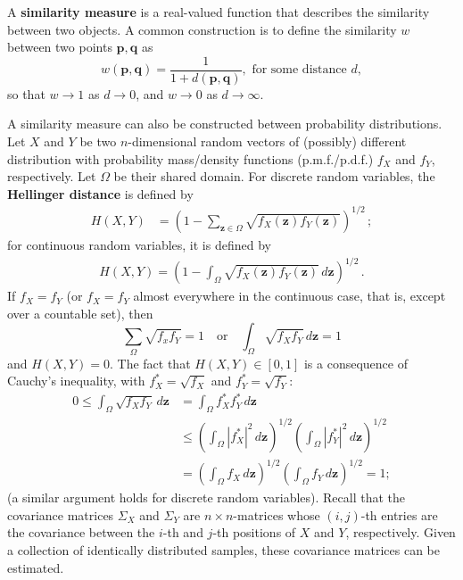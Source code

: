 A \textbf{similarity measure} is a real-valued function that describes the similarity between two objects.
A common construction is to define the similarity $w$ between two points $\mathbf{p},\mathbf{q}$ as $$w(\mathbf{p},\mathbf{q})=\frac{1}{1+d(\mathbf{p},\mathbf{q})}, \text{ for some distance }d,$$ so that $w\to 1$ as $d\to 0$, and $w\to 0$ as $d\to \infty$. \par  
A similarity measure can also be constructed between probability distributions.
Let $X$ and $Y$ be two $n$-dimensional random vectors of (possibly) different distribution with probability mass/density functions (p.m.f./p.d.f.) $f_X$ and $f_Y$, respectively. Let $\Omega$ be their shared domain.
For discrete random variables, the \textbf{Hellinger distance} is defined by 
\begin{align*}
H(X,Y)&=\left(1- \sum_{\mathbf{z} \in \Omega} \sqrt{f_X(\mathbf{z}) f_Y(\mathbf{z})}\right)^{1/2}\,;
\end{align*}
for continuous random variables, it is defined by
\begin{align*}
H(X,Y)= \left(1-\int_{\Omega} \sqrt{f_X(\mathbf{z}) f_Y(\mathbf{z})}\, d\mathbf{z}\right)^{1/2}\,. 
\end{align*} 
If $f_X=f_Y$ (or $f_X=f_Y$ almost everywhere in the continuous case, that is, except over a countable set), then $$\sum_{\Omega}\sqrt{f_xf_Y}=1 \quad\mbox{or} \quad \int_{\Omega}\sqrt{f_Xf_Y}\, d\mathbf{z}=1$$ and $H(X,Y)=0$. The fact that $H(X,Y)\in [0,1]$ is a consequence of Cauchy's inequality, with $f_X^*=\sqrt{f_X}$ and $f_Y^*=\sqrt{f_Y}$: \begin{align*}0\leq \int_{\Omega}\sqrt{f_Xf_Y}\, d\mathbf{z}&=\int_{\Omega}f_X^*f_Y^*\, d\mathbf{z}\\ &\leq \left(\int_{\Omega}|f_X^*|^2\, d\mathbf{z}\right)^{1/2}\left(\int_{\Omega}|f_Y^*|^2\, d\mathbf{z}\right)^{1/2} \\ &=\left(\int_{\Omega}f_X\, d\mathbf{z}\right)^{1/2}\left(\int_{\Omega}f_Y\, d\mathbf{z}\right)^{1/2}\!\!\!\!=1;\end{align*}
(a similar argument holds for discrete random variables). 
\newline\newline Recall that the covariance matrices $\Sigma_X$ and $\Sigma_Y$ are $n \times n$-matrices whose $(i,j)$-th entries are the covariance between the $i$-th and $j$-th positions of $X$ and $Y$, respectively. 
Given a collection of identically distributed samples, these covariance matrices can be estimated.


